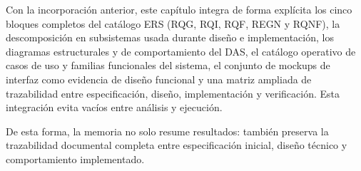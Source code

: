Con la incorporaci\'on anterior, este cap\'itulo integra de forma expl\'icita los cinco bloques completos del cat\'alogo ERS (RQG, RQI, RQF, REGN y RQNF), la descomposici\'on en subsistemas usada durante dise\~no e implementaci\'on, los diagramas estructurales y de comportamiento del DAS, el cat\'alogo operativo de casos de uso y familias funcionales del sistema, el conjunto de mockups de interfaz como evidencia de dise\~no funcional y una matriz ampliada de trazabilidad entre especificaci\'on, dise\~no, implementaci\'on y verificaci\'on. Esta integraci\'on evita vac\'ios entre an\'alisis y ejecuci\'on.

De esta forma, la memoria no solo resume resultados: tambi\'en preserva la
trazabilidad documental completa entre especificaci\'on inicial, dise\~no t\'ecnico
y comportamiento implementado.

\FloatBarrier
